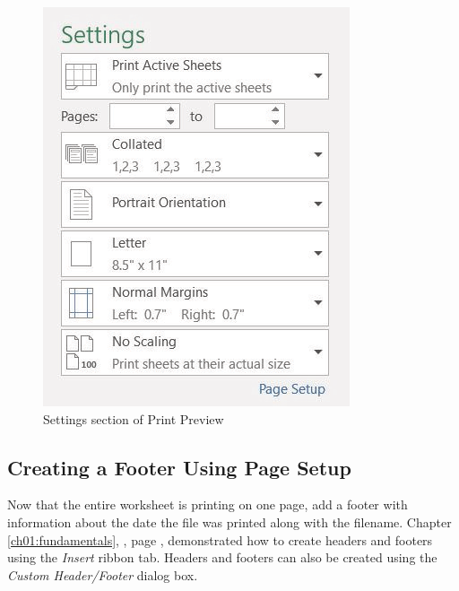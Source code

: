 \begin{figure}[H]
	\centering
	\includegraphics[width=\maxwidth{.95\linewidth}]{gfx/ch02_fig43}
	\caption{Settings section of Print Preview}
	\label{02:fig43}
\end{figure}

\subsection{Creating a Footer Using Page Setup}

Now that the entire worksheet is printing on one page, add a footer with information about the date the file was printed along with the filename. Chapter \ref{ch01:fundamentals}, , page \pageref{ch01:fundamentals}, demonstrated how to create headers and footers using the \textit{Insert} ribbon tab. Headers and footers can also be created using the \textit{Custom Header/Footer} dialog box.

